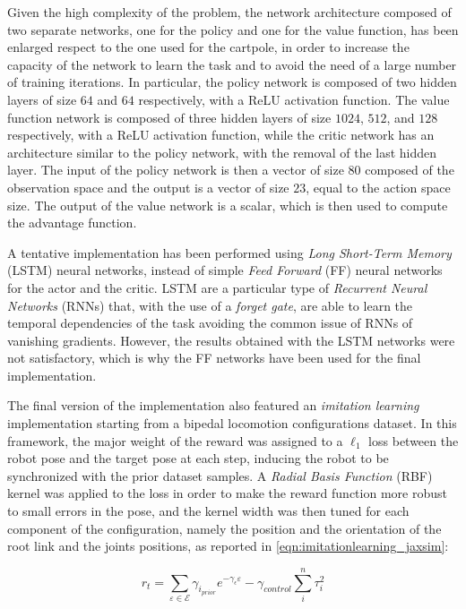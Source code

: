 Given the high complexity of the problem, the network architecture composed of two separate networks, one for the policy and one for the value function, has been enlarged respect to the one used for the cartpole, in order to increase the capacity of the network to learn the task and to avoid the need of a large number of training iterations. In particular, the policy network is composed of two hidden layers of size $64$ and $64$ respectively, with a \ac{ReLU} activation function. The value function network is composed of three hidden layers of size $1024$, $512$, and $128$ respectively, with a \ac{ReLU} activation function, while the critic network has an architecture similar to the policy network, with the removal of the last hidden layer. The input of the policy network is then a vector of size $80$ composed of the observation space and the output is a vector of size $23$, equal to the action space size.
The output of the value network is a scalar, which is then used to compute the advantage function.

A tentative implementation has been performed using \textit{Long Short-Term Memory} (LSTM) neural networks, instead of simple \textit{Feed Forward} (FF) neural networks for the actor and the critic. \ac{LSTM} are a particular type of \textit{Recurrent Neural Networks} (RNNs) that, with the use of a \textit{forget gate}, are able to learn the temporal dependencies of the task avoiding the common issue of \ac{RNN}s of vanishing gradients. However, the results obtained with the \ac{LSTM} networks were not satisfactory, which is why the \ac{FF} networks have been used for the final implementation.

The final version of the implementation also featured an \textit{imitation learning} implementation starting from a bipedal locomotion configurations dataset. In this framework, the major weight of the reward was assigned to a $\ell_1$ loss between the robot pose and the target pose at each step, inducing the robot to be synchronized with the prior dataset samples. A \textit{Radial Basis Function} (\ac{RBF}) kernel was applied to the loss in order to make the reward function more robust to small errors in the pose, and the kernel width was then tuned for each component of the configuration, namely the position and the orientation of the root link and the joints positions, as reported in \cref{eqn:imitationlearning_jaxsim}:

\begin{equation}
    \label{eqn:imitationlearning_jaxsim}
    r _t = \sum _{\varepsilon \in \mathcal{E}} \gamma _{i _{prior}} e ^{-\gamma _{\epsilon} \varepsilon} - \gamma _{control} \sum _i ^{n} \tau _i ^2
\end{equation}

